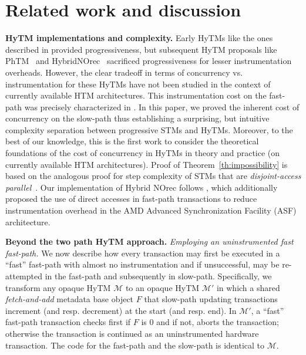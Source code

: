 \section{Related work and discussion}
\label{sec:rel}
%
\vspace{1mm}\noindent\textbf{HyTM implementations and complexity.}
Early HyTMs like the ones described in \cite{damronhytm, kumarhytm} provided progressiveness, but
subsequent HyTM proposals like PhTM~\cite{phasedtm} and HybridNOrec~\cite{hybridnorec} sacrificed progressiveness for lesser instrumentation overheads.
However, the clear tradeoff in terms of concurrency vs. instrumentation for these HyTMs have not been studied in the context of currently available HTM
architectures. This instrumentation cost on the fast-path was precisely characterized in \cite{hytm14disc}.
In this paper, we proved the inherent cost of concurrency on the slow-path thus establishing a surprising, 
but intuitive complexity separation between progressive STMs and HyTMs.
Moreover, to the best of our knowledge, this is the first work to consider the theoretical foundations of the cost of concurrency in 
HyTMs in theory and practice (on currently available HTM architectures).
Proof of Theorem~\ref{th:impossibility} is based on the analogous proof for step complexity of STMs that are \emph{disjoint-access parallel}~\cite{prog15-pact, tm-book}.
Our implementation of Hybrid NOrec follows \cite{hynorecriegel}, which additionally proposed the use of direct accesses
in fast-path transactions to reduce instrumentation overhead in the AMD Advanced Synchronization Facility (ASF) architecture.

\vspace{1mm}\noindent\textbf{Beyond the two path HyTM approach.}
\vspace{1mm}\noindent\textit{Employing an uninstrumented fast fast-path.}
We now describe how every transaction may first be executed in a ``fast'' fast-path with almost no instrumentation
and if unsuccessful, may be re-attempted in the fast-path and subsequently in slow-path.
Specifically, we transform any opaque HyTM $\mathcal{M}$ to an opaque
HyTM $\mathcal{M}'$ in which a shared \emph{fetch-and-add} metadata base object $F$ that slow-path updating transactions
increment (and resp. decrement) at the start (and resp. end). In $\mathcal{M}'$, a ``fast'' fast-path transaction checks first if $F$ is $0$
and if not, aborts the transaction; otherwise the transaction is continued as an uninstrumented hardware transaction.
The code for the fast-path and the slow-path is identical to $\mathcal{M}$.

